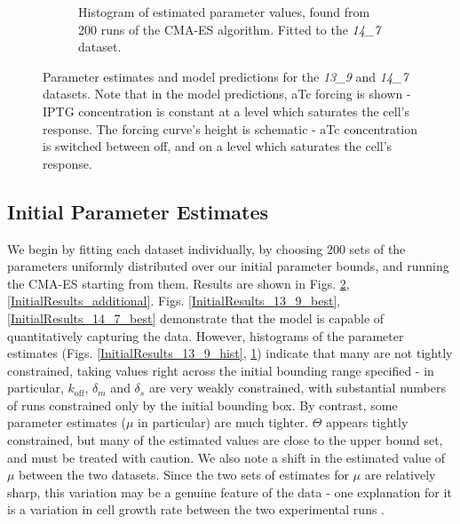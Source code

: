 \documentclass[10pt,journal]{./IEEE_latex_class/IEEEtran}
\begin{document}
\begin{figure}
\begin{subfigure}[c]{0.49\textwidth}
        \caption{Histogram of estimated parameter values, found from 200 runs of the CMA-ES algorithm. Fitted to the \textit{14\_7} dataset. }
        \label{InitialResults_14_7_hist}
    \end{subfigure}
    \caption{Parameter estimates and model predictions for the \textit{13\_9} and \textit{14\_7} datasets. Note that in the model predictions, aTc forcing is shown - IPTG concentration is constant at a level which saturates the cell's response. The forcing curve's height is schematic - aTc concentration is switched between off, and on a level which saturates the cell's response.}
\label{InitialResults}
\end{figure} 
 


\subsection{Initial Parameter Estimates}
\label{Initial Parameter Estimates}


 We begin by fitting each dataset individually, by choosing 200 sets of the parameters uniformly distributed over our initial parameter bounds, and running the CMA-ES starting from them. Results are shown in Figs. \ref{InitialResults}, \ref{InitialResults_additional}. Figs. \ref{InitialResults_13_9_best}, \ref{InitialResults_14_7_best}  demonstrate that the model is capable of quantitatively capturing the data. However, histograms of the parameter estimates (Figs. \ref{InitialResults_13_9_hist}, \ref{InitialResults_14_7_hist}) indicate that many are not tightly constrained, taking values right across the initial bounding range specified - in particular, $k_\mathrm{off}$, $\delta_{m}$ and $\delta_{s}$ are very weakly constrained, with substantial numbers of runs constrained only by the initial bounding box. By contrast, some parameter estimates ($\mu$ in particular) are much tighter. $\Theta$ appears tightly constrained, but many of the estimated values are close to the upper bound set, and must be treated with caution. We also note a shift in the estimated value of $\mu$ between the two datasets. Since the two sets of estimates for $\mu$ are relatively sharp, this variation may be a genuine feature of the data - one explanation for it is a variation in cell growth rate between the two experimental runs \cite{Hu2015}.
\end{document}
